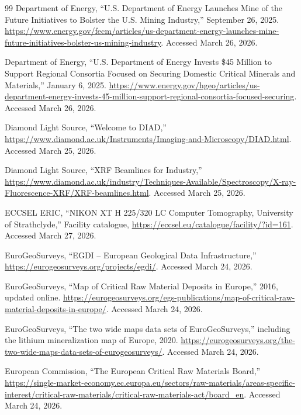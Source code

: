 \documentclass[12pt,a4paper]{article}
\begin{document}
\begin{thebibliography}{99}
Department of Energy, ``U.S. Department of Energy Launches Mine of the Future Initiatives to Bolster the U.S. Mining Industry,'' September 26, 2025. \url{https://www.energy.gov/fecm/articles/us-department-energy-launches-mine-future-initiatives-bolster-us-mining-industry}. Accessed March 26, 2026.

Department of Energy, ``U.S. Department of Energy Invests \$45 Million to Support Regional Consortia Focused on Securing Domestic Critical Minerals and Materials,'' January 6, 2025. \url{https://www.energy.gov/hgeo/articles/us-department-energy-invests-45-million-support-regional-consortia-focused-securing}. Accessed March 26, 2026.

Diamond Light Source, ``Welcome to DIAD,'' \url{https://www.diamond.ac.uk/Instruments/Imaging-and-Microscopy/DIAD.html}. Accessed March 25, 2026.

Diamond Light Source, ``XRF Beamlines for Industry,'' \url{https://www.diamond.ac.uk/industry/Techniques-Available/Spectroscopy/X-ray-Fluorescence-XRF/XRF-beamlines.html}. Accessed March 25, 2026.

ECCSEL ERIC, ``NIKON XT H 225/320 LC Computer Tomography, University of Strathclyde,'' Facility catalogue, \url{https://eccsel.eu/catalogue/facility/?id=161}. Accessed March 27, 2026.

EuroGeoSurveys, ``EGDI -- European Geological Data Infrastructure,'' \url{https://eurogeosurveys.org/projects/egdi/}. Accessed March 24, 2026.

EuroGeoSurveys, ``Map of Critical Raw Material Deposits in Europe,'' 2016, updated online. \url{https://eurogeosurveys.org/egs-publications/map-of-critical-raw-material-deposits-in-europe/}. Accessed March 24, 2026.

EuroGeoSurveys, ``The two wide maps data sets of EuroGeoSurveys,'' including the lithium mineralization map of Europe, 2020. \url{https://eurogeosurveys.org/the-two-wide-maps-data-sets-of-eurogeosurveys/}. Accessed March 24, 2026.

European Commission, ``The European Critical Raw Materials Board,'' \url{https://single-market-economy.ec.europa.eu/sectors/raw-materials/areas-specific-interest/critical-raw-materials/critical-raw-materials-act/board_en}. Accessed March 24, 2026.


\end{thebibliography}
\end{document}
